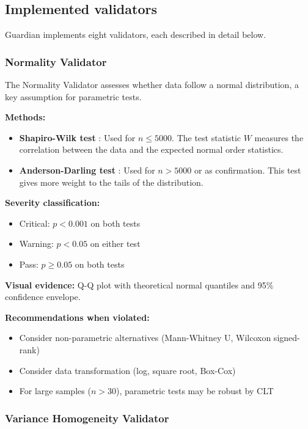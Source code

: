 \documentclass[article]{jss}
\begin{document}
\subsection{Implemented validators}

Guardian implements eight validators, each described in detail below.

\subsubsection{Normality Validator}

The Normality Validator assesses whether data follow a normal distribution, a key assumption for parametric tests.

\textbf{Methods:}
\begin{itemize}
\item \textbf{Shapiro-Wilk test} \citep{shapiro1965analysis}: Used for $n \leq 5000$. The test statistic $W$ measures the correlation between the data and the expected normal order statistics.
\item \textbf{Anderson-Darling test} \citep{anderson1954test}: Used for $n > 5000$ or as confirmation. This test gives more weight to the tails of the distribution.
\end{itemize}

\textbf{Severity classification:}
\begin{itemize}
\item Critical: $p < 0.001$ on both tests
\item Warning: $p < 0.05$ on either test
\item Pass: $p \geq 0.05$ on both tests
\end{itemize}

\textbf{Visual evidence:} Q-Q plot with theoretical normal quantiles and 95\% confidence envelope.

\textbf{Recommendations when violated:}
\begin{itemize}
\item Consider non-parametric alternatives (Mann-Whitney U, Wilcoxon signed-rank)
\item Consider data transformation (log, square root, Box-Cox)
\item For large samples ($n > 30$), parametric tests may be robust by CLT
\end{itemize}

\subsubsection{Variance Homogeneity Validator}
\end{document}
